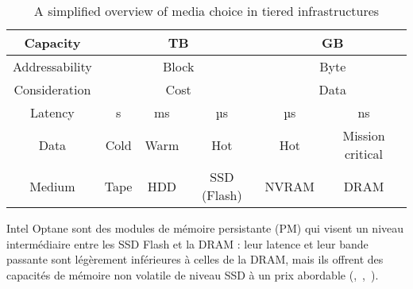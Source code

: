 \begin{table}[H]
    \caption{A simplified overview of media choice in tiered infrastructures}
    \centering
    \begin{tabular}{|c|ccc|cc|}
        \hline
        Capacity       & \multicolumn{3}{c|}{TB}                                     & \multicolumn{2}{c|}{GB}                     \\ \hline
        Addressability & \multicolumn{3}{c|}{Block}                                  & \multicolumn{2}{c|}{Byte}                   \\ \hline
        Consideration  & \multicolumn{3}{c|}{Cost}                                   & \multicolumn{2}{c|}{Data}                   \\ \hline
        Latency        & \multicolumn{1}{c|}{s}    & \multicolumn{1}{c|}{ms}   & µs  & \multicolumn{1}{c|}{µs}  & ns               \\ \hline
        Data           & \multicolumn{1}{c|}{Cold} & \multicolumn{1}{c|}{Warm} & Hot & \multicolumn{1}{c|}{Hot}   & Mission critical \\ \hline
        Medium         & \multicolumn{1}{c|}{Tape} & \multicolumn{1}{c|}{HDD}  & SSD (Flash) & \multicolumn{1}{c|}{NVRAM} & DRAM             \\ \hline
    \end{tabular}
    \label{table:tiered-storage}
\end{table}

Intel Optane sont des modules de mémoire persistante (PM) qui visent un niveau intermédiaire entre les SSD Flash et la DRAM : leur latence et leur bande passante sont légèrement inférieures à celles de la DRAM, mais ils offrent des capacités de mémoire non volatile de niveau SSD à un prix abordable (\cite{boukhobzaEmergingNvm},~\cite{Izraelevitz2019BasicPM},~\cite{boukhobzaFlashMemory}).

